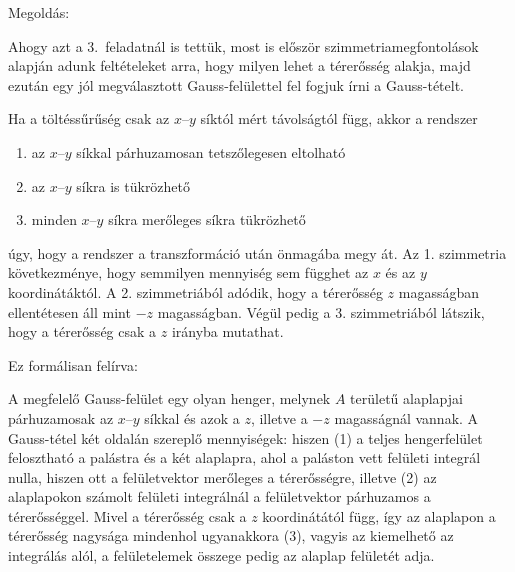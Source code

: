 
\ifdefined\megoldas
   

 Megoldás: 

 Ahogy azt a 3.\ feladatnál is tettük, most is először szimmetriamegfontolások alapján adunk feltételeket arra, hogy milyen lehet a térerősség alakja, majd ezután egy jól megválasztott Gauss-felülettel fel fogjuk írni a Gauss-tételt. 

 Ha a töltéssűrűség csak az $x$--$y$ síktól mért távolságtól függ, akkor a rendszer 
 \begin{enumerate}[itemsep=0pt]
  \item az $x$--$y$ síkkal párhuzamosan tetszőlegesen eltolható
  \item az $x$--$y$ síkra is tükrözhető
  \item minden $x$--$y$ síkra merőleges síkra tükrözhető
 \end{enumerate}
 úgy, hogy a rendszer a transzformáció után önmagába megy át. Az 1. szimmetria következménye, hogy semmilyen mennyiség sem függhet az $x$ és az $y$ koordinátáktól. A 2. szimmetriából adódik, hogy a térerősség $z$ magasságban ellentétesen áll mint $-z$ magasságban. Végül pedig a 3. szimmetriából látszik, hogy a térerősség csak a $z$ irányba mutathat. 

 Ez formálisan felírva:

 A megfelelő Gauss-felület egy olyan henger, melynek $A$ területű alaplapjai párhuzamosak az $x$--$y$ síkkal és azok a $z$, illetve a $-z$ magasságnál vannak. A Gauss-tétel két oldalán szereplő mennyiségek:
 hiszen (1) a teljes hengerfelület felosztható a palástra és a két alaplapra, ahol a paláston vett felületi integrál nulla, hiszen ott a felületvektor merőleges a térerősségre, illetve (2) az alaplapokon számolt felületi integrálnál a felületvektor párhuzamos a térerősséggel. Mivel a térerősség csak a $z$ koordinátától függ, így az alaplapon a térerősség nagysága mindenhol ugyanakkora (3), vagyis az kiemelhető az integrálás alól, a felületelemek összege pedig az alaplap felületét adja.

